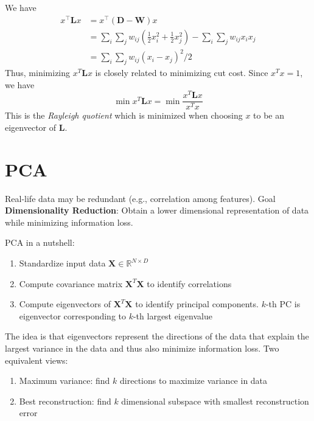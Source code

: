 \documentclass[11pt, %
	oneside, %
	english, %
	onehalfspacing, %
	parskip, %
	]{article} %
\theoremstyle{definition}
\begin{document}
We have
\begin{equation*}
	\begin{aligned}
		x^{\top} \mathbf{L} x&=x^{\top}(\mathbf{D}-\mathbf{W}) x \\
		&= \sum_i \sum_j w_{i j}\left(\frac{1}{2} x_i^2+\frac{1}{2} x_j^2\right)-\sum_i \sum_j w_{i j} x_i x_j \\
		&= \sum_i \sum_j w_{i j}\left(x_i-x_j\right)^2 / 2
	\end{aligned}
\end{equation*}
Thus, minimizing $x^T \mathbf{L} x$ is closely related to minimizing cut cost. Since $x^Tx = 1$, we have
\begin{equation*}
	\min x^T \mathbf{L} x = \min \frac{x^T \mathbf{L} x}{x^T x}
\end{equation*}
This is the \emph{Rayleigh quotient} which is minimized when choosing $x$ to be an eigenvector of $\mathbf{L}$.



\section{PCA}

Real-life data may be redundant (e.g., correlation among features). Goal \textbf{Dimensionality Reduction}: Obtain a lower dimensional representation of data while minimizing information loss.

PCA in a nutshell:

\begin{enumerate}
	\item Standardize input data $\mathbf{X} \in \mathbb{R}^{N \times D}$
	\item Compute covariance matrix $\mathbf{X}^T \mathbf{X}$ to identify correlations
	\item  Compute eigenvectors of $\mathbf{X}^T \mathbf{X}$ to identify principal components. $k$-th PC is eigenvector corresponding to $k$-th largest eigenvalue
\end{enumerate}

The idea is that eigenvectors represent the directions of the data that explain the largest variance in the data and thus also minimize information loss. Two equivalent views:
\begin{enumerate}
	\item Maximum variance: find $k$ directions to maximize variance in data
	\item Best reconstruction: find $k$ dimensional subspace with smallest reconstruction error
\end{enumerate}
\end{document}
